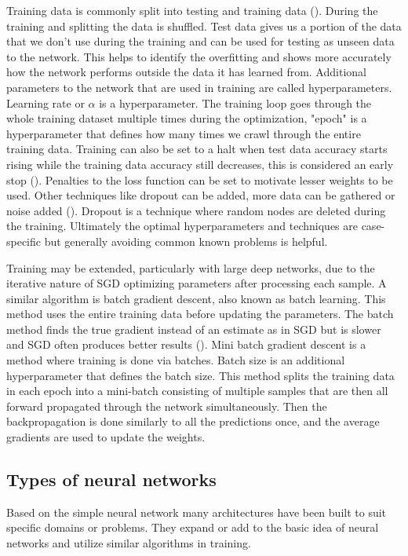 Training data is commonly split into testing and training data (\cite{Goodfellow-et-al-2016}). During the training and splitting the data is shuffled. Test data gives us a portion of the data that we don't use during the training and can be used for testing as unseen data to the network. This helps to identify the overfitting and shows more accurately how the network performs outside the data it has learned from. Additional parameters to the network that are used in training are called hyperparameters. Learning rate or \(\alpha\) is a hyperparameter. The training loop goes through the whole training dataset multiple times during the optimization, "epoch" is a hyperparameter that defines how many times we crawl through the entire training data. Training can also be set to a halt when test data accuracy starts rising while the training data accuracy still decreases, this is considered an early stop (\cite{overfit}). Penalties to the loss function can be set to motivate lesser weights to be used. Other techniques like dropout can be added, more data can be gathered or noise added (\cite{overfit}). Dropout is a technique where random nodes are deleted during the training. Ultimately the optimal hyperparameters and techniques are case-specific but generally avoiding common known problems is helpful. 

Training may be extended, particularly with large deep networks, due to the iterative nature of SGD optimizing parameters after processing each sample. A similar algorithm is batch gradient descent, also known as batch learning. This method uses the entire training data before updating the parameters. The batch method finds the true gradient instead of an estimate as in SGD but is slower and SGD often produces better results (\cite{LECUN2000}). Mini batch gradient descent is a method where training is done via batches. Batch size is an additional hyperparameter that defines the batch size. This method splits the training data in each epoch into a mini-batch consisting of multiple samples that are then all forward propagated through the network simultaneously. Then the backpropagation is done similarly to all the predictions once, and the average gradients are used to update the weights. 


\subsection{Types of neural networks}

Based on the simple neural network many architectures have been built to suit specific domains or problems. They expand or add to the basic idea of neural networks and utilize similar algorithms in training.

